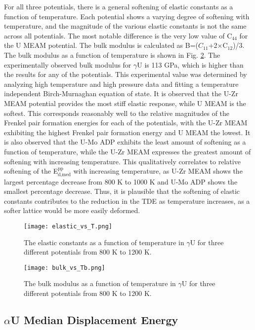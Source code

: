 \documentclass[review]{elsarticle}
\begin{document}
For all three potentials, there is a general softening of elastic constants as a function of temperature. Each potential shows a varying degree of softening with temperature, and the magnitude of the various elastic constants is not the same across all potentials. The most notable difference is the very low value of C$_{44}$ for the U MEAM potential. The bulk modulus is calculated as B=($C_{11}$+2$\times$C$_{12}$)/3. The bulk modulus as a function of temperature is shown in Fig. \ref{fig:bulk}. The experimentally observed bulk modulus for $\gamma$U is 113 GPa\cite{yoo1998}, which is higher than the results for any of the potentials. This experimental value was determined by analyzing high temperature and high pressure data and fitting a temperature independent Birch-Murnaghan equation of state. It is observed that the U-Zr MEAM potential provides the most stiff elastic response, while U MEAM is the softest. This corresponds reasonably well to the relative magnitudes of the Frenkel pair formation energies for each of the potentials, with the U-Zr MEAM exhibiting the highest Frenkel pair formation energy and U MEAM the lowest. It is also observed that the U-Mo ADP exhibits the least amount of softening as a function of temperature, while the U-Zr MEAM expresses the greatest amount of softening with increasing temperature. This qualitatively correlates to relative softening of the E$^{\textrm{pp}}_{\textrm{d,med}}$ with increasing temperature, as U-Zr MEAM shows the largest percentage decrease from 800 K to 1000 K and U-Mo ADP shows the smallest percentage decrease. Thus, it is plausible that the softening of elastic constants contributes to the reduction in the TDE as temperature increases, as a softer lattice would be more easily deformed. 


\begin{figure}[h]
 \centering
 \texttt{[image: elastic\_vs\_T.png]} 
 \caption{The elastic constants as a function of temperature in $\gamma$U for three different potentials from 800 K to 1200 K.}
 \label{fig:elastic}
\end{figure}

\begin{figure}[h]
 \centering
 \texttt{[image: bulk\_vs\_Tb.png]} 
 \caption{The bulk modulus as a function of temperature in $\gamma$U for three different potentials from 800 K to 1200 K.}
 \label{fig:bulk}
\end{figure}

\FloatBarrier

\subsection{$\alpha$U Median Displacement Energy}
\end{document}
